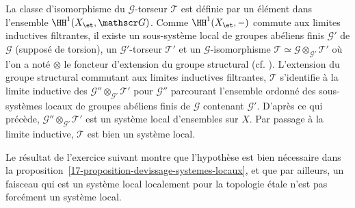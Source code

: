 \documentclass[10pt]{../fichiers-configuration-latex/smfart}
\begin{document}
La classe d'isomorphisme du $\mathscr G$-torseur $\mathscr T$ est définie
par un élément dans l'ensemble $\HH^1(X_\et,\mathscr G)$. Comme
$\HH^1(X_\et, -)$ commute aux limites inductives filtrantes, il existe un
sous-système local de groupes abéliens finis
$\mathscr G'$ de $\mathscr G$ (supposé de torsion),
un $\mathscr G'$-torseur $\mathscr T'$ et un $\mathscr G$-isomorphisme
$\mathscr T\simeq \mathscr G\otimes_{\mathscr G'}\mathscr T'$ où l'on a
noté $\otimes$ le foncteur d'extension du groupe structural (cf.
\cite[proposition~1.3.6, Chapitre~III]{CNA@Giraud}). L'extension du groupe
structural commutant aux limites inductives filtrantes, $\mathscr T$
s'identifie à la limite inductive des $\mathscr G''\otimes_{\mathscr
G'}\mathscr T'$ pour $\mathscr G''$ parcourant l'ensemble ordonné des
sous-systèmes locaux de groupes abéliens finis de $\mathscr G$ contenant
$\mathscr G'$. D'après ce qui précède, $\mathscr G''\otimes_{\mathscr
G'}\mathscr T'$ est un système local d'ensembles sur $X$.  Par passage à la
limite inductive, $\mathscr T$ est bien un système local.

\bigskip

Le résultat de l'exercice suivant montre que l'hypothèse 
est bien nécessaire dans la
proposition~\ref{17-proposition-devissage-systemes-locaux}, et que par
ailleurs, un faisceau qui est un système local localement pour la topologie
étale n'est pas forcément un système local.
\end{document}

